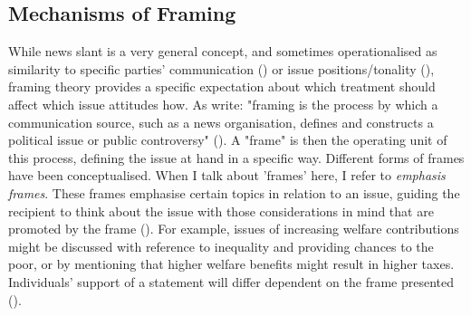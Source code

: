 \documentclass{article}
\begin{document}




\subsection{Mechanisms of Framing}

While news slant is a very general concept, and sometimes operationalised as similarity to specific parties' communication (\cite{Gentzkow2010}) or issue positions/tonality (\cite{Spirig2020}), framing theory provides a specific expectation about which treatment should affect which issue attitudes how. As \citeauthor{Nelson1997} write: "framing is the process by which a communication source, such as a news organisation, defines and constructs a political issue or public controversy" (\citeyear[567]{Nelson1997}). A "frame" is then the operating unit of this process, defining the issue at hand in a specific way. Different forms of frames have been conceptualised. When I talk about 'frames' here, I refer to \textit{emphasis frames}. These frames emphasise certain topics in relation to an issue, guiding the recipient to think about the issue with those considerations in mind that are promoted by the frame (\cite[153f]{Leeper2020}). For example, issues of increasing welfare contributions might be discussed with reference to inequality and providing chances to the poor, or by mentioning that higher welfare benefits might result in higher taxes. Individuals' support of a statement will differ dependent on the frame presented (\cite{sniderman2004structure}).
\end{document}
